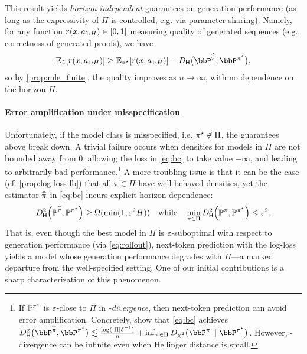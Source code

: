 This result yields \emph{horizon-independent} guarantees on generation
performance (as long as the expressivity of $\Pi$ is controlled,
e.g. via parameter sharing). Namely, for any function
$r(x,a_{1:H})\in\brk*{0,1}$ measuring quality of generated sequences (e.g., correctness of generated proofs), we have\loose
\begin{align}
  \label{eq:rollout}
  \En_{\pihat}\brk*{r(x,a_{1:H})} \geq
  \En_{\pistar}\brk*{r(x,a_{1:H})}
  - \DhelX{\big}{\bbP^{\pihat}}{\bbP^{\pistar}},
\end{align}
so by \cref{prop:mle_finite}, the quality improves as $n\to\infty$, with no dependence on the horizon $H$. %
\loose



\paragraph{Error amplification  under misspecification}
Unfortunately, if the model class is misspecified, i.e. $\pistar \not
\in \Pi$, the guarantees above break down. A trivial failure occurs when densities for models in $\Pi$ are not bounded away from $0$, allowing
the loss in \cref{eq:bc} to take value $-\infty$, and leading to arbitrarily bad performance.\footnote{If $\BP^{\pistar}$ is $\veps$-close to $\Pi$ in
  \emph{\chis-divergence}, then next-token prediction can 
  avoid error amplification. Concretely,
    \citet{foster2024behavior} show that \cref{eq:bc} achieves $\DhelsX{\big}{\bbP^{\pihat}}{\bbP^{\pistar}}
  \approxleq{} \frac{\log(\abs{\Pi}\delta^{-1})}{n} +
  \inf_{\pi\in\Pi}\DchisX{\big}{\bbP^{\pi}}{\bbP^{\pistar}}$.
  However, 
  \chis-divergence can be infinite even when Hellinger distance is small.} A more troubling issue is that it can be the case (cf. \cref{prop:log-loss-lb}) that all $\pi\in\Pi$ have well-behaved densities, yet the estimator $\pihat$ in \cref{eq:bc} incurs explicit horizon dependence: 
    \begin{equation}
      \Dhels{\BP^{\pihat}}{\BP^{\pistar}}\geq \Omega(\min(1, \veps^2 H)) \quad\text{while}\quad \min_{\pi\in\Pi}\Dhels{\BP^{\pi}}{\BP^{\pistar}} \leq \veps^2.
      \label{eq:failure-h}
    \end{equation}
  That is,
  even though the best model in $\Pi$ is
    $\veps$-suboptimal with respect to generation performance (via
    \cref{eq:rollout}), next-token prediction with the log-loss yields a model whose
    generation performance degrades with $H$---a marked departure from the well-specified setting. One of our initial contributions is a sharp characterization of this phenomenon.

